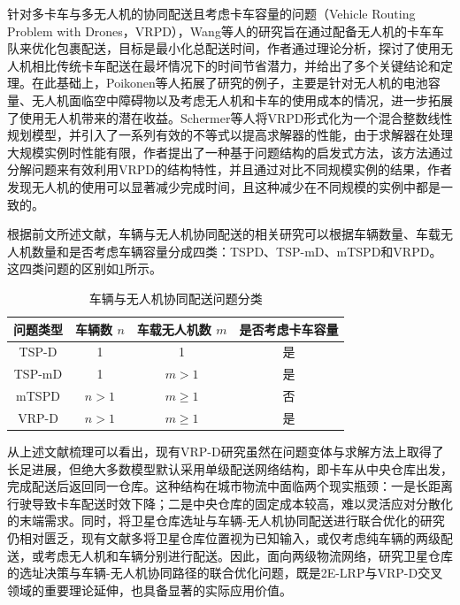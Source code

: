 \documentclass[fontset=none]{ctexart}
\begin{document}
针对多卡车与多无人机的协同配送且考虑卡车容量的问题（Vehicle Routing Problem with Drones，VRPD），Wang等人的研究旨在通过配备无人机的卡车车队来优化包裹配送\cite{wangVehicleRoutingProblem2017}，目标是最小化总配送时间，作者通过理论分析，探讨了使用无人机相比传统卡车配送在最坏情况下的时间节省潜力，并给出了多个关键结论和定理。在此基础上，Poikonen等人拓展了研究的例子\cite{poikonenVehicleRoutingProblem2017}，主要是针对无人机的电池容量、无人机面临空中障碍物以及考虑无人机和卡车的使用成本的情况，进一步拓展了使用无人机带来的潜在收益。Schermer等人将VRPD形式化为一个混合整数线性规划模型\cite{schermerMatheuristicVehicleRouting2019}，并引入了一系列有效的不等式以提高求解器的性能，由于求解器在处理大规模实例时性能有限，作者提出了一种基于问题结构的启发式方法，该方法通过分解问题来有效利用VRPD的结构特性，并且通过对比不同规模实例的结果，作者发现无人机的使用可以显著减少完成时间，且这种减少在不同规模的实例中都是一致的。

根据前文所述文献，车辆与无人机协同配送的相关研究可以根据车辆数量、车载无人机数量和是否考虑车辆容量分成四类：TSPD、TSP-mD、mTSPD和VRPD。这四类问题的区别如\cref{tab:tspd1}所示。

\begin{table}[!htbp]
    \centering
    \caption{车辆与无人机协同配送问题分类}\label{tab:tspd1}
    \begin{tabular}{cccc}
        \toprule[1pt] %
        问题类型 & 车辆数 $n$ & 车载无人机数 $m$ & 是否考虑卡车容量 \\
        \midrule[0.75pt] %
        TSP-D & 1 & 1 & 是 \\
        TSP-mD & 1 & $m > 1$ & 是 \\
        mTSPD & $n > 1$ & $m \geq 1$ & 否 \\
        VRP-D & $n > 1$ & $m \geq 1$ & 是 \\
        \bottomrule[1pt] %
    \end{tabular}
\end{table}

从上述文献梳理可以看出，现有VRP-D研究虽然在问题变体与求解方法上取得了长足进展，但绝大多数模型默认采用单级配送网络结构，即卡车从中央仓库出发，完成配送后返回同一仓库。这种结构在城市物流中面临两个现实瓶颈：一是长距离行驶导致卡车配送时效下降；二是中央仓库的固定成本较高，难以灵活应对分散化的末端需求。同时，将卫星仓库选址与车辆-无人机协同配送进行联合优化的研究仍相对匮乏\cite{zhangCollaborativeVehicledroneDistribution2023,liMultiechelonLocationRouting2026}，现有文献多将卫星仓库位置视为已知输入，或仅考虑纯车辆的两级配送，或考虑无人机和车辆分别进行配送。因此，面向两级物流网络，研究卫星仓库的选址决策与车辆-无人机协同路径的联合优化问题，既是2E-LRP与VRP-D交叉领域的重要理论延伸，也具备显著的实际应用价值。
\end{document}
